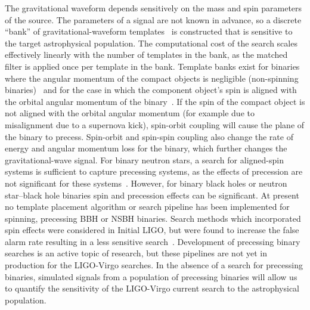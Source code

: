 The gravitational waveform depends
sensitively on the mass and spin parameters of the source.  The parameters of
a signal are not known in advance, so 
a discrete ``bank'' of gravitational-waveform
templates~\cite{Owen:1998dk,Owen:1995tm,Balasubramanian:1995bm,Dhurandhar:1992mw,Sathyaprakash:1991mt} is constructed that is sensitive to the target astrophysical  population.
The computational cost of the search scales effectively linearly with the number
of templates in the bank, as the matched filter is applied once per template
in the bank. Template banks exist for binaries where the
angular momentum of the compact objects is negligible (non-spinning
binaries)~\cite{Cokelaer:2007kx,Babak:2006ty} and for the case in which the
component object's spin is aligned with the orbital angular momentum of the
binary~\cite{Brown:2012qf,Harry:2013tca}.
If the spin of the compact object is not aligned with the orbital angular
momentum (for example due to misalignment due to a supernova kick), spin-orbit
coupling will cause the plane of the binary to precess.  Spin-orbit and
spin-spin coupling also change the rate of energy and angular momentum loss
for the binary, which further changes the gravitational-wave signal.  
For binary neutron stars, a search for aligned-spin systems is sufficient to
capture precessing systems, as the effects of precession are not significant
for these systems~\cite{Brown:2012qf}.  However, for
binary black holes or neutron star--black hole binaries spin and precession
effects can be significant.  At present no template placement algorithm or
search pipeline has been implemented for spinning, precessing \ac{BBH} or \ac{NSBH}
binaries.  Search methods which incorporated spin effects were considered
in Initial LIGO, but were found to increase the false alarm rate 
resulting in a less sensitive
search~\cite{Pan:2003qt,Buonanno:2005pt,VanDenBroeck:2009gd}. Development of
precessing binary searches is an active topic of research, but these pipelines
are not yet in production for the LIGO-Virgo searches. In 
the absence of a search for precessing binaries, simulated signals from
a population of precessing binaries will allow us to quantify
the sensitivity of the LIGO-Virgo current search to the astrophysical population.


